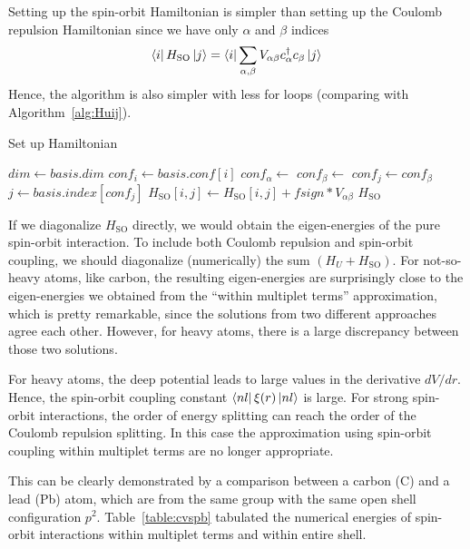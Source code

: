 Setting up the spin-orbit Hamiltonian is simpler than setting up the Coulomb
repulsion Hamiltonian since we have only $\alpha$ and $\beta$ indices
\begin{equation} \label{eq:Hsoij}
\Bra{i} H_\text{SO} \Ket{j} = 
\Bra{i} \sum_{\alpha,\beta} V_{\alpha\beta} c_\alpha^\dag c_\beta \Ket{j}
\end{equation}
%
Hence, the algorithm is also simpler with less for loops (comparing with Algorithm~\ref{alg:Huij}).
\begin{algorithm}[h!]
\caption{Set up Hamiltonian}\label{alg:Hsoij}
\begin{algorithmic}[1]
\State $dim \gets basis.dim$
\State $conf_i \gets basis.conf[i]$
\ForAll {$\alpha$}
\State $conf_\alpha \gets$ 
\ForAll {$\beta$}
\State $conf_\beta \gets$ 
\State $conf_j \gets conf_\beta$
\State $j \gets basis.index[conf_j]$
\State $H_\text{SO}[i,j] \gets H_\text{SO}[i,j] + fsign*V_{\alpha\beta}$
\EndIf
\EndFor
\EndIf
\EndFor
\EndFor
\State \Return $H_\text{SO}$
\EndFunction
\end{algorithmic}
\end{algorithm}

If we diagonalize $H_\text{SO}$ directly, we would obtain the eigen-energies
of the pure spin-orbit interaction. To include both Coulomb repulsion and spin-orbit coupling,
we should diagonalize (numerically) the sum $(H_U+H_\text{SO})$.
For not-so-heavy atoms, like carbon, the resulting eigen-energies are surprisingly close
to the eigen-energies we obtained from the ``within multiplet terms'' approximation, which
is pretty remarkable, since the solutions from two different approaches agree each other.
However, for heavy atoms, there is a large discrepancy between those two solutions.

For heavy atoms, the deep potential leads to large values in the derivative $dV/dr$.
Hence, the spin-orbit coupling constant $\Bra{nl}\xi(r)\Ket{nl}$ is large. For
strong spin-orbit interactions, the order of energy splitting can reach the order
of the Coulomb repulsion splitting.
In this case the approximation using spin-orbit coupling within multiplet terms
are no longer appropriate.

This can be clearly demonstrated by a comparison between a carbon (C) and a lead (Pb)
atom, which are from the same group with the same open shell configuration $p^2$.
Table~\ref{table:cvspb} tabulated the numerical energies of spin-orbit interactions
within multiplet terms and within entire shell.

